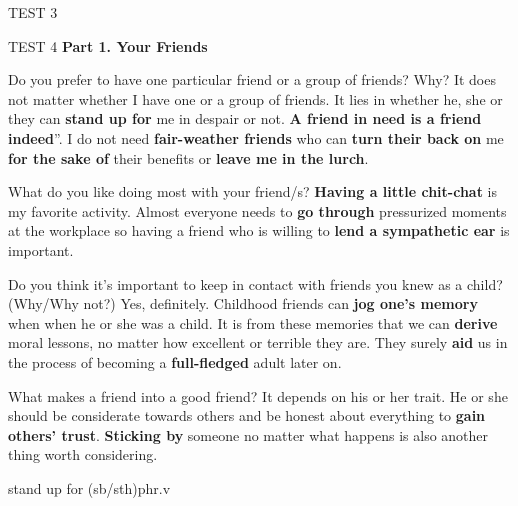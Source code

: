 \begin{glossarymc}[Cambridge 6]
\begin{test}{TEST 3}
    \end{test}

    \begin{test}{TEST 4}
    \noindent
    \textbf{Part 1. Your Friends}
    \begin{qa}{Do you prefer to have one particular friend or a group of friends? Why?}
    It does not matter whether I have one or a group of friends. It lies in whether he, she or they can \textbf{stand up for} me in despair or not. \`\`\textbf{A friend in need is a friend indeed}''. I do not need \textbf{fair-weather friends} who can \textbf{turn their back on} me \textbf{for the sake of} their benefits or \textbf{leave me in the lurch}.
    \end{qa}

    \begin{qa}{What do you like doing most with your friend/s?}
    \textbf{Having a little chit-chat} is my favorite activity. Almost everyone needs to \textbf{go through} pressurized moments at the workplace so having a friend who is willing to \textbf{lend a sympathetic ear} is important.
    \end{qa}

    \begin{qa}{Do you think it's important to keep in contact with friends you knew as a child? (Why/Why not?)}
    Yes, definitely. Childhood friends can \textbf{jog one's memory} when when he or she was a child. It is from these memories that we can \textbf{derive} moral lessons, no matter how excellent or terrible they are. They surely \textbf{aid} us in the process of becoming a \textbf{full-fledged} adult later on.
    \end{qa}

    \begin{qa}{What makes a friend into a good friend?}
    It depends on his or her trait. He or she should be considerate towards others and be honest about everything to \textbf{gain others' trust}. \textbf{Sticking by} someone no matter what happens is also another thing worth considering.
    \end{qa}

        \begin{VocabExplain}[Part 1]
            \begin{ExplainCard}{stand up for (sb/sth)}{phr.v}
            \end{ExplainCard}


\end{VocabExplain}
\end{test}
\end{glossarymc}
